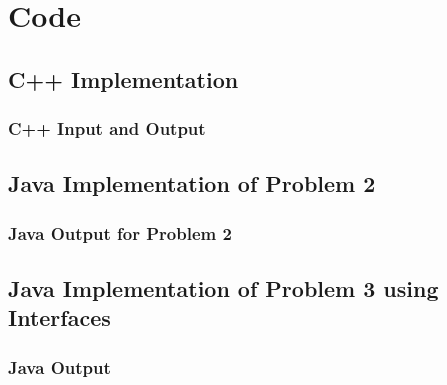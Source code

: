 \documentclass[11pt]{article}
\begin{document}
\section{Code}
\subsection{C++ Implementation}



\subsubsection{C++ Input and Output}


\subsection{Java Implementation of Problem 2}




\subsubsection{Java Output for Problem 2}


\subsection{Java Implementation of Problem 3 using Interfaces}




\subsubsection{Java Output}

\end{document}

